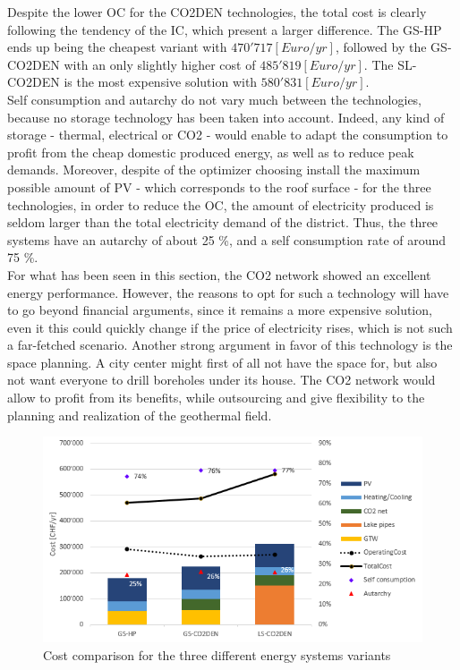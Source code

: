 \documentclass{article}
\begin{document}
Despite the lower OC for the CO2DEN technologies, the total cost is clearly following the tendency of the IC, which present a larger difference. The GS-HP ends up being the cheapest variant with $470'717 [Euro/yr]$, followed by the GS-CO2DEN with an only slightly higher cost of $485'819 [Euro/yr]$. The SL-CO2DEN is the most expensive solution with $580'831 [Euro/yr]$.\\

Self consumption and autarchy do not vary much between the technologies, because no storage technology has been taken into account. Indeed, any kind of storage - thermal, electrical or CO2 - would enable to adapt the consumption to profit from the cheap domestic produced energy, as well as to reduce peak demands. Moreover, despite of the optimizer choosing install the maximum possible amount of PV - which corresponds to the roof surface - for the three technologies, in order to reduce the OC, the amount of electricity produced is seldom larger than the total electricity demand of the district. Thus, the three systems have an autarchy of about 25 \%, and a self consumption rate of around 75 \%.\\

For what has been seen in this section, the CO2 network showed an excellent energy performance. However, the reasons to opt for such a technology will have to go beyond financial arguments, since it remains a more expensive solution, even it this could quickly change if the price of electricity rises, which is not such a far-fetched scenario. Another strong argument in favor of this technology is the space planning. A city center might first of all not have the space for, but also not want everyone to drill boreholes under its house. The CO2 network would allow to profit from its benefits, while outsourcing and give flexibility to the planning and realization of the geothermal field.

\begin{figure}[htp]
	\centering
	\includegraphics[width=1\textwidth]{V_costs.PNG}
	\caption{Cost comparison for the three different energy systems variants}
	\label{fig:V_costs}
\end{figure}
\end{document}
